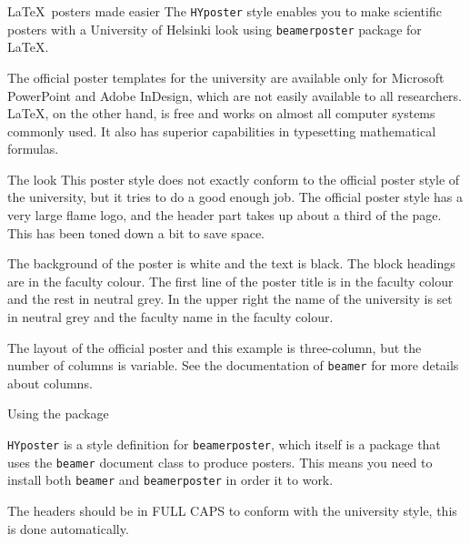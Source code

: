 \documentclass[final]{beamer}
\author[Wilkman]{Olli Wilkman}
\institute[University of Helsinki]{}
\date{\today}
\begin{document}
\begin{frame}[t, fragile]
\begin{columns}[T]
	
\begin{column}{0.32\linewidth}


\begin{block}{\LaTeX~posters made easier}
The \texttt{HYposter} style enables you to make scientific posters with a University of Helsinki look using  \texttt{beamerposter} package for \LaTeX. 

The official poster templates for the university are available only for Microsoft PowerPoint and Adobe InDesign, which are not easily available to all researchers. \LaTeX, on the other hand, is free and works on almost all computer systems commonly used. It also has superior capabilities in typesetting mathematical formulas.

\end{block}


\begin{block}{The look}
This poster style does not exactly conform to the official poster style of the university, but it tries to do a good enough job. The official poster style has a very large flame logo, and the header part takes up about a third of the page. This has been toned down a bit to save space.

The background of the poster is white and the text is black. The block headings are in the faculty colour. The first line of the poster title is in the faculty colour and the rest in neutral grey. In the upper right the name of the university is set in neutral grey and the faculty name in the faculty colour.

The layout of the official poster and this example is three-column, but the number of columns is variable. See the documentation of \texttt{beamer} for more details about columns.
\end{block}


\begin{block}{Using the package}

\texttt{HYposter} is a style definition for \texttt{beamerposter}, which itself is a package that uses the \texttt{beamer} document class to produce posters. This means you need to install both \texttt{beamer} and \texttt{beamerposter} in order it to work.

The headers should be in FULL CAPS to conform with the university style, this is done automatically.
\end{block}


\end{column}
\end{columns}
\end{frame}
\end{document}
